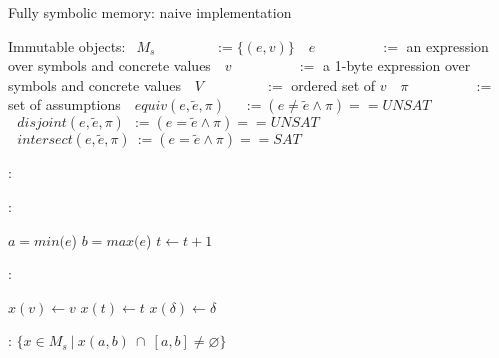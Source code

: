\documentclass{article}
\let\emptyset\varnothing
\begin{document}
\begin{algorithm}
  \normalsize

  \caption{Fully symbolic memory: naive implementation}
  \begin{algorithmic}
  	\State Immutable objects:
  	\State $~~M_s~~~~~~~~~~~~~~~~~~~:= \{(e,v)\}$ 
  	\State $~~~e~~~~~~~~~~~~~~~~~~~\,~:=$ an expression over symbols and concrete values
  	\State $~~~v~~~~~~~~~~~~~~~~~~~~\,:=$ a 1-byte expression over symbols and concrete values
  	\State $~~~V~~~~~~~~~~~~~~~~~~~\,:=$ ordered set of $v$
  	\State $~~~\pi~~~~~~~~~~~~~~~~~~~~\,:=$ set of assumptions
  	\State $~~~equiv(e, \widetilde{e}, \pi)~~~~~\,:= (e \not = \widetilde{e} \wedge \pi) == UNSAT$ 
  	\State $~~~disjoint(e, \widetilde{e}, \pi)~~:=  (e = \widetilde{e} \wedge \pi) == UNSAT$ 
  	\State $~~~intersect(e, \widetilde{e}, \pi)~:=  (e = \widetilde{e} \wedge \pi) == SAT$ 

  \end{algorithmic}

  \bigskip
  
  \begin{algorithmic}[1]
	:
			\State {}
		\EndFor
	\EndFunction
  \end{algorithmic}

  \bigskip

  \begin{algorithmic}[1]
	:
		
		\State $a = min(e$)
		\State $b = max(e$)
		\State $t \leftarrow t + 1$
		\State {}

	\EndFunction
  \end{algorithmic}

  \bigskip

  \begin{algorithmic}[1]
	:
		
				\State $x(v) \leftarrow v$
				\State $x(t) \leftarrow t$
				\State $x(\delta) \leftarrow \delta$
				\State \Return
			\EndIf
			\State {}
		\EndFor

	\EndFunction
  \end{algorithmic}

  \bigskip

  \begin{algorithmic}[1]
	:
		\State \Return $\{x \in M_s~|~x(a,b)~\cap~[a, b] \neq \emptyset\}$
	\EndFunction
  \end{algorithmic}

\end{algorithm}
  
\end{document}
